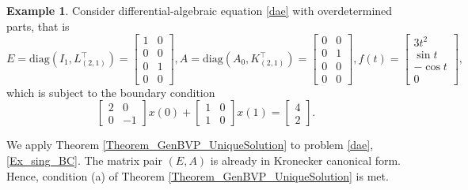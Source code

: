 \documentclass[preprint,12pt]{elsarticle}
\numberwithin{equation}{section}
\theoremstyle{definition}
\newtheorem{example}[theorem]{Example}
\begin{document}
\begin{example} Consider differential-algebraic equation \eqref{dae} with
overdetermined parts, that is
\begin{equation*}
    E=\text{diag}(I_1,L_{(2,1)}^\top)=\left[\begin{array}{c|c}
        1 & 0\\ \hline0 & 0\\ 0 & 1\\0 & 0
    \end{array}\right], A=\text{diag}(A_0,K_{(2,1)}^\top)=\left[\begin{array}{c|c}
        0 & 0\\ \hline0 & 1\\ 0 & 0\\0 & 0
    \end{array}\right], f(t)=\begin{bmatrix}
        3t^2\\ \sin t \\ -\cos t\\0
        \end{bmatrix},
\end{equation*}
which is subject to the boundary condition
\begin{equation}\label{Ex_sing_BC}
    \begin{bmatrix}
        2 & 0\\ 0 & -1
    \end{bmatrix}x(0)+\begin{bmatrix}
        1 & 0\\ 1 & 0
    \end{bmatrix}x(1)=\begin{bmatrix}
        4\\ 2
    \end{bmatrix}.
\end{equation}

We apply Theorem \ref{Theorem_GenBVP_UniqueSolution} to problem \eqref{dae}, \eqref{Ex_sing_BC}. The matrix pair $(E,A)$ is already in Kronecker canonical form. Hence, condition (a) of Theorem \ref{Theorem_GenBVP_UniqueSolution} is met.


\end{example}
\end{document}
